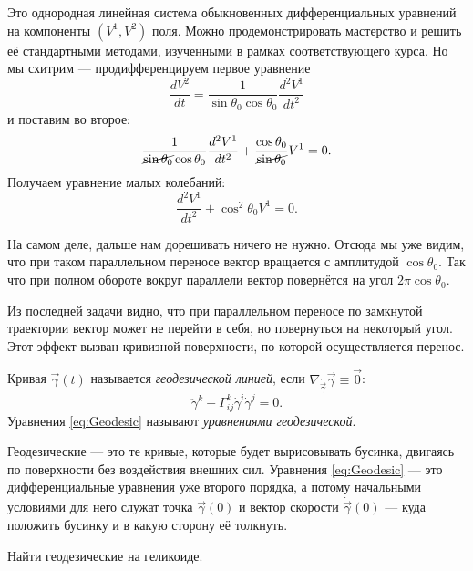 \begin{solution}
	Это однородная линейная система обыкновенных дифференциальных уравнений на компоненты $(V^1, V^2)$ поля. Можно продемонстрировать мастерство и решить её стандартными методами, изученными в рамках соответствующего курса. Но мы схитрим --- продифференцируем первое уравнение
	\[
		\frac{dV^2}{dt} = \frac{1}{\sin\theta_0\cos\theta_0}\frac{d^2V^1}{dt^2}
	\]
	и поставим во второе:
	\[
		\frac{1}{\cancel{\sin\theta_0}\cos\theta_0}\frac{d^2V^1}{dt^2} + \frac{\cos\theta_0}{\cancel{\sin\theta_0}}V^1 = 0.
	\]
	Получаем уравнение малых колебаний:
	\[
		\frac{d^2V^1}{dt^2} + \cos^2\theta_0V^1 = 0.
	\]

	На самом деле, дальше нам дорешивать ничего не нужно. Отсюда мы уже видим, что при таком параллельном переносе вектор вращается с амплитудой $\cos\theta_0$. Так что при полном обороте вокруг параллели вектор повернётся на угол $2\pi\cos\theta_0$.
\end{solution}

Из последней задачи видно, что при параллельном переносе по замкнутой траектории вектор может не перейти в себя, но повернуться на некоторый угол. Этот эффект вызван кривизной поверхности, по которой осуществляется перенос.

\begin{definition}
	Кривая $\vec{\gamma}(t)$ называется \textit{геодезической линией}, если $\nabla_{\dot{\vec{\gamma}}}\dot{\vec{\gamma}} \equiv \vec{0}$:
	\begin{equation} \label{eq:Geodesic}
		\ddot{\gamma}^k + \Gamma_{ij}^k\dot{\gamma}^i\dot\gamma^j = 0.
	\end{equation}
	Уравнения \eqref{eq:Geodesic} называют \textit{уравнениями геодезической}.
\end{definition}

Геодезические --- это те кривые, которые будет вырисовывать бусинка, двигаясь по поверхности без воздействия внешних сил. Уравнения \eqref{eq:Geodesic} --- это дифференциальные уравнения уже \underline{второго} порядка, а потому начальными условиями для него служат точка $\vec{\gamma}(0)$ и вектор скорости $\dot{\vec{\gamma}}(0)$ --- куда положить бусинку и в какую сторону её толкнуть.

\begin{problem}
	Найти геодезические на геликоиде.
\end{problem}

